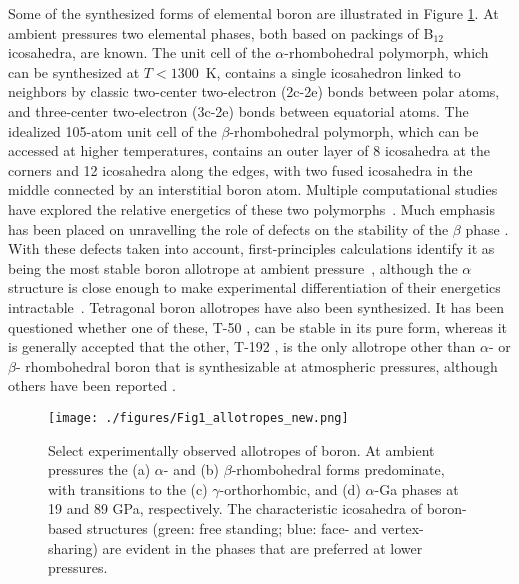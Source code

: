 \documentclass[reprint,aps,prl,twocolumn,letterpaper]{revtex4-2}
\newlength{\figurewidth}
\begin{document}
Some of the synthesized forms of elemental boron are illustrated in Figure \ref{fig:Boron_allotropes.png}. 
At ambient pressures two elemental phases, both based on packings of B$_{12}$ icosahedra, are known. The unit cell of the $\alpha$-rhombohedral polymorph, which can be synthesized at $T<1300$~K, contains a single icosahedron linked to neighbors by classic two-center two-electron (2c-2e) bonds between polar atoms, and three-center two-electron (3c-2e) bonds between equatorial atoms. The idealized 105-atom unit cell of the $\beta$-rhombohedral polymorph, which can be accessed at higher temperatures, contains an outer layer of 8 icosahedra at the corners and 12 icosahedra along the edges, with two fused icosahedra in the middle connected by an interstitial boron atom. Multiple computational studies have explored the relative energetics of these two polymorphs~\cite{Masago:2006a, Masago:2004, Masago:2005, Prasad:2005, Shang:2007, Siberchicot:2007, deGroot:2007, Mikhalkovic:2008a, Mikhalkovic:2008b, Ogitsu:2009, Ogitsu:2010, Ogitsu:2012, Ogitsu:2015}. Much emphasis has been placed on unravelling the role of defects on the stability of the $\beta$ phase \cite{Ogitsu:2013,Ogitsu:2009, Ogitsu:2010}. With these defects taken into account, first-principles calculations identify it as being the most stable boron allotrope at ambient pressure~\cite{deGroot:2007,Mikhalkovic:2008b,Ogitsu:2009}, although the $\alpha$ structure is close enough to make experimental differentiation of their energetics intractable~\cite{Ogitsu:2015}. Tetragonal boron allotropes have also been synthesized. It has been questioned whether one of these, T-50 \cite{Laubengeyer:1943,Hoard:1951, Hoard:1958, Hoard:1960}, can be stable in its pure form, whereas it is generally accepted that the other, T-192 \cite{Talley:1960,Vlasse:1979a,Vlasse:1979b},  is the only allotrope other than $\alpha$- or $\beta$- rhombohedral boron that is synthesizable at atmospheric pressures, although others have been reported \cite{Parakhonskiy:2013,Karmodak:2017,An:2016a}.


\begin{figure}
\begin{center}
\texttt{[image: ./figures/Fig1\_allotropes\_new.png]}
\end{center}
\caption{Select experimentally observed allotropes of boron. At ambient pressures the (a) $\alpha$- and (b) $\beta$-rhombohedral forms predominate, with transitions to the (c) $\gamma$-orthorhombic, and (d) $\alpha$-Ga phases at 19 and 89 GPa, respectively. The characteristic icosahedra of boron-based structures (green: free standing; blue: face- and vertex-sharing) are evident in the phases that are preferred at lower pressures.
\label{fig:Boron_allotropes.png}}
\end{figure}
\end{document}
